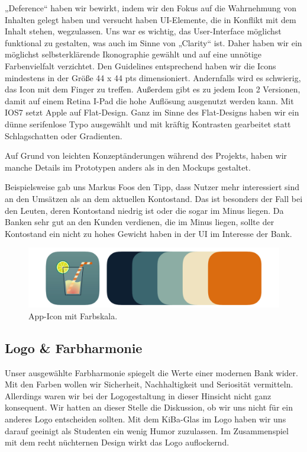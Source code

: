 	„Deference“ haben wir bewirkt, indem wir den Fokus auf die Wahrnehmung von Inhalten gelegt haben und versucht haben UI-Elemente, die in Konflikt mit dem Inhalt stehen, wegzulassen. Uns war es wichtig, das User-Interface möglichst funktional zu gestalten, was auch im Sinne von „Clarity“ ist. Daher haben wir ein möglichst selbsterklärende Ikonographie gewählt und auf eine unnötige Farbenvielfalt verzichtet. Den Guidelines entsprechend haben wir die Icons mindestens in der Größe 44 x 44 pts dimensioniert. Andernfalls wird es schwierig, das Icon mit dem Finger zu treffen. Außerdem gibt es zu jedem Icon 2 Versionen, damit auf einem Retina I-Pad die hohe Auflösung ausgenutzt werden kann. Mit IOS7 setzt Apple auf Flat-Design. Ganz im Sinne des Flat-Designs haben wir ein dünne serifenlose Typo ausgewählt und mit kräftig Kontrasten gearbeitet statt Schlagschatten oder Gradienten.

	Auf Grund von leichten Konzeptänderungen während des Projekts, haben wir manche Details im Prototypen anders als in den Mockups gestaltet.
	
	Beispielsweise gab uns Markus Foos den Tipp, dass Nutzer mehr interessiert sind an den Umsätzen als an dem aktuellen Kontostand. Das ist besonders der Fall bei den Leuten, deren Kontostand niedrig ist oder die sogar im Minus liegen. Da Banken sehr gut an den Kunden verdienen, die im Minus liegen, sollte der Kontostand ein nicht zu hohes Gewicht haben in der UI im Interesse der Bank. \par

\begin{figure}[h]
	\centering
	\includegraphics[scale=.52]{Pictures/Logo}
	\caption{App-Icon mit Farbskala.}
\end{figure}
\subsection{Logo \& Farbharmonie}
	Unser ausgewählte Farbharmonie spiegelt die Werte einer modernen Bank wider. Mit den Farben wollen wir Sicherheit, Nachhaltigkeit und Seriosität vermitteln. Allerdings waren wir bei der Logogestaltung in dieser Hinsicht nicht ganz konsequent. Wir hatten an dieser Stelle die Diskussion, ob wir uns nicht für ein anderes Logo entscheiden sollten. Mit dem KiBa-Glas im Logo haben wir uns darauf geeinigt als Studenten ein wenig Humor zuzulassen. Im Zusammenspiel mit dem recht nüchternen Design wirkt das Logo auflockernd.

